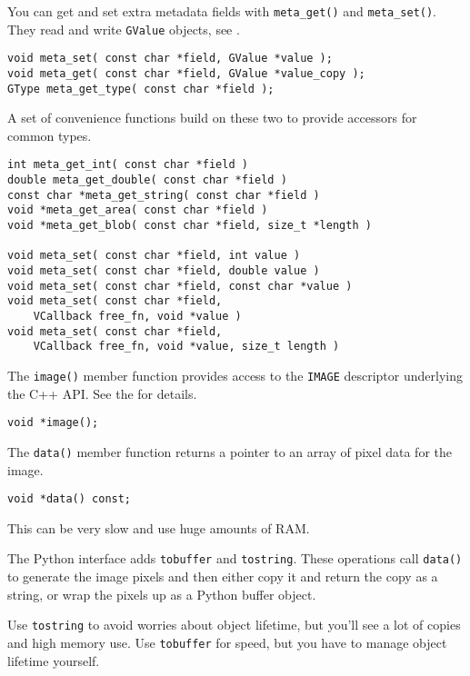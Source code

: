 You can get and set extra metadata fields with \verb+meta_get()+ and
\verb+meta_set()+. They read and write \verb+GValue+ objects, see 
.

\begin{verbatim}
void meta_set( const char *field, GValue *value );
void meta_get( const char *field, GValue *value_copy );
GType meta_get_type( const char *field );
\end{verbatim}

A set of convenience functions build on these two to provide accessors for
common types.

\begin{verbatim}
int meta_get_int( const char *field )
double meta_get_double( const char *field )
const char *meta_get_string( const char *field )
void *meta_get_area( const char *field )
void *meta_get_blob( const char *field, size_t *length ) 

void meta_set( const char *field, int value ) 
void meta_set( const char *field, double value )
void meta_set( const char *field, const char *value )
void meta_set( const char *field, 
	VCallback free_fn, void *value ) 
void meta_set( const char *field, 
	VCallback free_fn, void *value, size_t length ) 
\end{verbatim}

The \verb+image()+ member function provides access to the \verb+IMAGE+
descriptor underlying the C++ API. See the  for details.

\begin{verbatim}
void *image();
\end{verbatim}

The \verb+data()+ member function returns a pointer to an array of pixel data
for the image. 

\begin{verbatim}
void *data() const;
\end{verbatim}

\noindent
This can be very slow and use huge amounts of RAM.

The Python interface adds \verb+tobuffer+ and \verb+tostring+. These
operations call \verb+data()+ to generate the image pixels and then either
copy it and return the copy as a string, or wrap the pixels up as a Python
buffer object.

Use \verb+tostring+ to avoid worries about object lifetime, but you'll see a
lot of copies and high memory use. Use \verb+tobuffer+ for speed, but you
have to manage object lifetime yourself.

